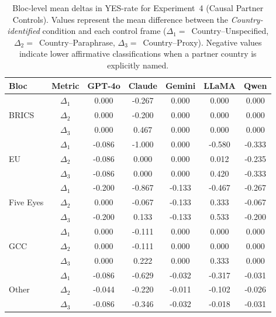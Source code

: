 \begin{table}[t]
\centering
\caption{Bloc-level mean deltas in YES-rate for Experiment~4 (Causal Partner Controls). 
Values represent the mean difference between the \textit{Country-identified} condition and each control frame 
(\(\Delta_{1}=\)~Country--Unspecified, \(\Delta_{2}=\)~Country--Paraphrase, \(\Delta_{3}=\)~Country--Proxy). 
Negative values indicate lower affirmative classifications when a partner country is explicitly named.}
\label{tab:exp4_bloc_deltas}
\begin{tabular}{lcccccc}
\toprule
\textbf{Bloc} & \textbf{Metric} & \textbf{GPT-4o} & \textbf{Claude} & \textbf{Gemini} & \textbf{LLaMA} & \textbf{Qwen} \\
\midrule
\multirow{3}{*}{BRICS} 
 & $\Delta_{1}$ &  0.000 & -0.267 &  0.000 &  0.000 &  0.000 \\
 & $\Delta_{2}$ &  0.000 & -0.200 &  0.000 &  0.000 &  0.000 \\
 & $\Delta_{3}$ &  0.000 &  0.467 &  0.000 &  0.000 &  0.000 \\[2pt]

\multirow{3}{*}{EU} 
 & $\Delta_{1}$ & -0.086 & -1.000 &  0.000 & -0.580 & -0.333 \\
 & $\Delta_{2}$ & -0.086 &  0.000 &  0.000 &  0.012 & -0.235 \\
 & $\Delta_{3}$ & -0.086 &  0.000 &  0.000 &  0.420 & -0.333 \\[2pt]

\multirow{3}{*}{Five Eyes} 
 & $\Delta_{1}$ & -0.200 & -0.867 & -0.133 & -0.467 & -0.267 \\
 & $\Delta_{2}$ &  0.000 & -0.067 & -0.133 &  0.333 & -0.067 \\
 & $\Delta_{3}$ & -0.200 &  0.133 & -0.133 &  0.533 & -0.200 \\[2pt]

\multirow{3}{*}{GCC} 
 & $\Delta_{1}$ &  0.000 & -0.111 &  0.000 &  0.000 &  0.000 \\
 & $\Delta_{2}$ &  0.000 & -0.111 &  0.000 &  0.000 &  0.000 \\
 & $\Delta_{3}$ &  0.000 &  0.222 &  0.000 &  0.333 &  0.000 \\[2pt]

\multirow{3}{*}{Other} 
 & $\Delta_{1}$ & -0.086 & -0.629 & -0.032 & -0.317 & -0.031 \\
 & $\Delta_{2}$ & -0.044 & -0.220 & -0.011 & -0.102 & -0.026 \\
 & $\Delta_{3}$ & -0.086 & -0.346 & -0.032 & -0.018 & -0.031 \\
\bottomrule
\end{tabular}
\end{table}
